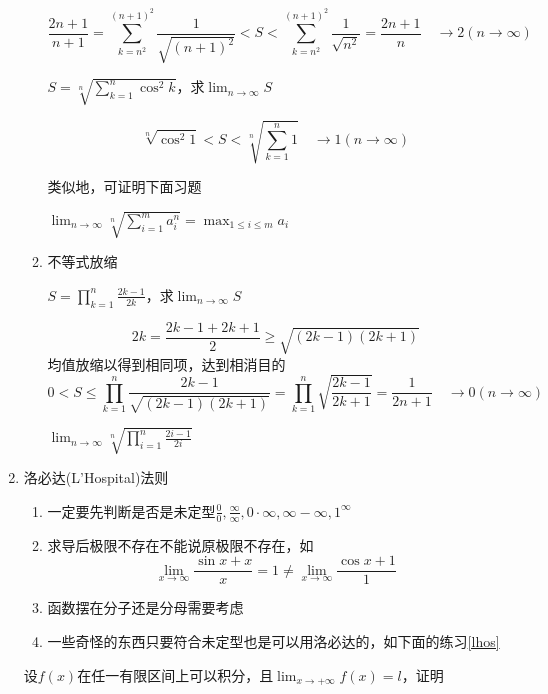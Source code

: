 \begin{enumerate}
\begin{enumerate}
\begin{example}
		\end{example}
		\begin{analysis}\[\frac{2n+1}{n+1}=\sum _{k=n^2}^{(n+1)^2}\frac{1}{\sqrt{(n+1)^2}}<S<\sum _{k=n^2}^{(n+1)^2}\frac{1}{\sqrt{n^2}}=\frac{2n+1}{n}\quad\to 2(n\to\infty)\]
		\end{analysis}
		\begin{example}
		\label{jb2}
		$\displaystyle S=\sqrt[n]{\sum_{k=1}^{n}\cos^2 k}$，求$\displaystyle\lim_{n\to\infty}S$
		\end{example}
		\begin{analysis}
		\[\sqrt[n]{\cos^2 1}<S<\sqrt[n]{\sum_{k=1}^{n}1}\quad\to 1(n\to\infty)\]
		\end{analysis}
		类似地，可证明下面习题
		\begin{exercise}
		$\displaystyle \lim_{n\to\infty}\sqrt[n]{\sum_{i=1}^{m}a_i^n}=\max_{1\leq i\leq m}a_i$
		\end{exercise}
		\item 不等式放缩
		\begin{example}
		$\displaystyle S=\prod_{k=1}^{n}\frac{2k-1}{2k}$，求$\displaystyle\lim_{n\to\infty}S$
		\end{example}
		\begin{analysis}
		\[2k=\frac{2k-1+2k+1}{2}\ge\sqrt{(2k-1)(2k+1)}\]
		均值放缩以得到相同项，达到相消目的
		\[0<S\leq\prod_{k=1}^{n}\frac{2k-1}{\sqrt{(2k-1)(2k+1)}}=\prod_{k=1}^{n}\sqrt{\frac{2k-1}{2k+1}}=\frac{1}{2n+1}\quad\to 0(n\to\infty)\]
		\end{analysis}
		\begin{exercise}
		$\displaystyle\lim_{n\to\infty}\sqrt[n]{\prod_{i=1}^{n}\frac{2i-1}{2i}}$
		\end{exercise}
	\end{enumerate}
	\item 洛必达(L'Hospital)法则
	\begin{enumerate}
		\item 一定要先判断是否是未定型$\displaystyle\frac{0}{0},\frac{\infty}{\infty},0\cdot\infty,\infty-\infty,1^\infty$
		\item 求导后极限不存在不能说原极限不存在，如
		\[\lim_{x\to\infty}\frac{\sin x+x}{x}=1\ne\lim_{x\to\infty}\frac{\cos x+1}{1}\]
		\item 函数摆在分子还是分母需要考虑
		\item 一些奇怪的东西只要符合未定型也是可以用洛必达的，如下面的练习\ref{lhos}
	\end{enumerate}
	\begin{exercise}
	\label{lhos}
	设$f(x)$在任一有限区间上可以积分，且$\displaystyle\lim_{x\to+\infty}f(x)=l$，证明

\end{exercise}
\end{enumerate}
